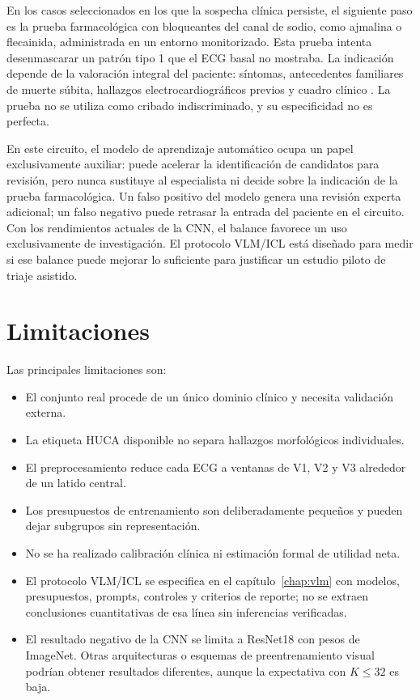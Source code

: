 En los casos seleccionados en los que la sospecha clínica persiste, el siguiente paso es la prueba farmacológica con bloqueantes del canal de sodio, como ajmalina o flecainida, administrada en un entorno monitorizado. Esta prueba intenta desenmascarar un patrón tipo 1 que el ECG basal no mostraba. La indicación depende de la valoración integral del paciente: síntomas, antecedentes familiares de muerte súbita, hallazgos electrocardiográficos previos y cuadro clínico \cite{wilde2023scbt}. La prueba no se utiliza como cribado indiscriminado, y su especificidad no es perfecta.

En este circuito, el modelo de aprendizaje automático ocupa un papel exclusivamente auxiliar: puede acelerar la identificación de candidatos para revisión, pero nunca sustituye al especialista ni decide sobre la indicación de la prueba farmacológica. Un falso positivo del modelo genera una revisión experta adicional; un falso negativo puede retrasar la entrada del paciente en el circuito. Con los rendimientos actuales de la CNN, el balance favorece un uso exclusivamente de investigación. El protocolo VLM/ICL está diseñado para medir si ese balance puede mejorar lo suficiente para justificar un estudio piloto de triaje asistido.

\section{Limitaciones}

Las principales limitaciones son:

\begin{itemize}
  \item El conjunto real procede de un único dominio clínico y necesita validación externa.
  \item La etiqueta HUCA disponible no separa hallazgos morfológicos individuales.
  \item El preprocesamiento reduce cada ECG a ventanas de V1, V2 y V3 alrededor de un latido central.
  \item Los presupuestos de entrenamiento son deliberadamente pequeños y pueden dejar subgrupos sin representación.
  \item No se ha realizado calibración clínica ni estimación formal de utilidad neta.
  \item El protocolo VLM/ICL se especifica en el capítulo~\ref{chap:vlm} con modelos, presupuestos, prompts, controles y criterios de reporte; no se extraen conclusiones cuantitativas de esa línea sin inferencias verificadas.
  \item El resultado negativo de la CNN se limita a ResNet18 con pesos de ImageNet. Otras arquitecturas o esquemas de preentrenamiento visual podrían obtener resultados diferentes, aunque la expectativa con \(K \leq 32\) es baja.
\end{itemize}


